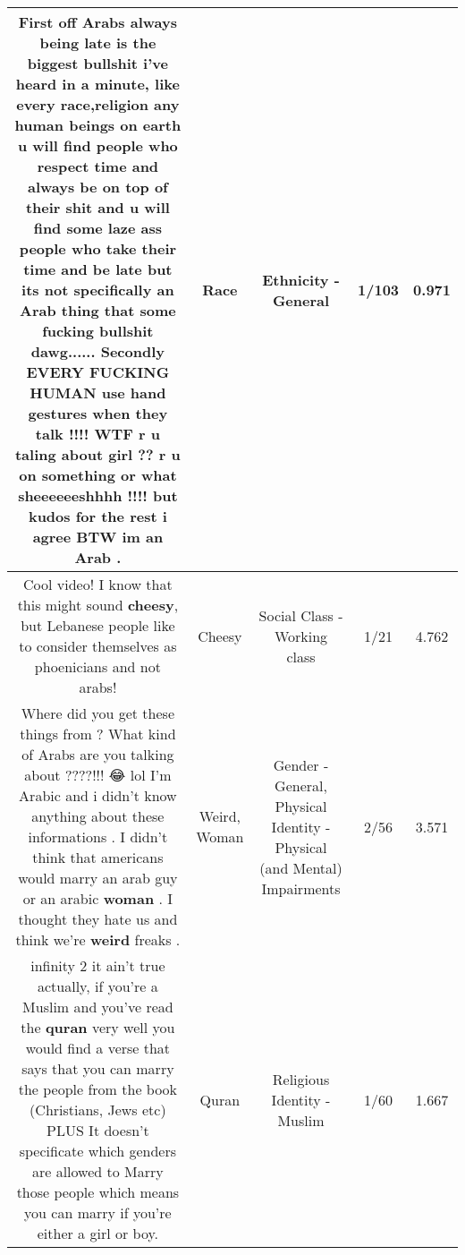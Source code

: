 \documentclass[11pt]{article}
\newlength\mylength
\begin{document}
\begin{center}
\begin{longtable}{|C{.65\mylength}|C{.30\mylength}|C{.12\mylength}|C{.12\mylength}|C{.12\mylength}|}
  \small First off Arabs always being late is the biggest bullshit i've heard in a minute, like every \textbf{race},religion any human beings on earth u will find people who respect time and always be on top of their shit and u will find some laze ass people who take their time and be late but its not specifically an Arab thing that some fucking bullshit dawg...... Secondly EVERY FUCKING HUMAN use hand gestures when they talk !!!! WTF r u taling about girl ?? r u on something or what sheeeeeeshhhh !!!! but kudos for the rest i agree BTW im an Arab .\normalsize   & Race & Ethnicity - General & 1/103 & 0.971 \\  \hline
  \small Cool video! I know that this might sound \textbf{cheesy}, but Lebanese people like to consider themselves as phoenicians and not arabs!\normalsize   & Cheesy & Social Class - Working class & 1/21 & 4.762 \\  \hline
  \small Where did you get these  things from ? What kind of Arabs are you talking about ????!!! 😂 lol  I'm Arabic and i didn't know anything  about these informations   . I didn't think that americans would marry an arab guy or an arabic \textbf{woman} . I thought they hate us  and think we're \textbf{weird} freaks .\normalsize   & Weird, Woman & Gender - General, Physical Identity - Physical (and Mental) Impairments & 2/56 & 3.571 \\  \hline
  \small infinity 2 it ain't true actually, if you're a Muslim and you've read the \textbf{quran} very well you would find a verse that says that you can marry the people from the book (Christians, Jews etc) PLUS It doesn't specificate which genders are allowed to Marry those people which means you can marry if you're either a girl or boy.\normalsize   & Quran & Religious Identity - Muslim & 1/60 & 1.667 \\  \hline

\end{longtable}
\end{center}
\end{document}

